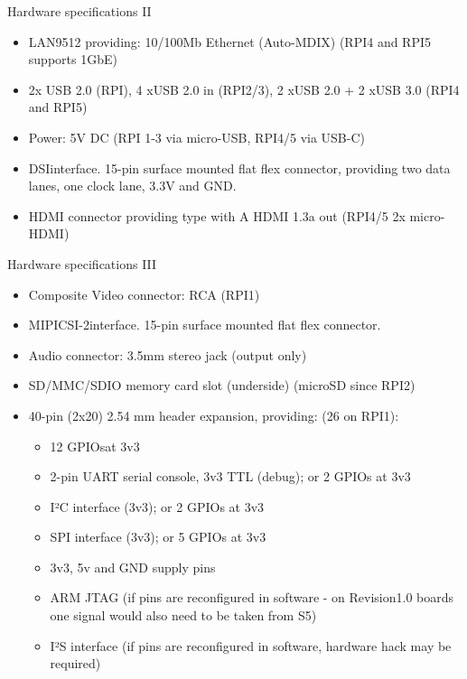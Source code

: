 \begin{frame}{Hardware specifications II}
    \begin{itemize}
        \item LAN9512 providing: 10/100Mb Ethernet (Auto-MDIX) (RPI4 and RPI5 supports 1GbE)
        \item 2x USB 2.0 (RPI), 4 xUSB 2.0 in (RPI2/3), 2 xUSB 2.0 + 2 xUSB 3.0 (RPI4 and RPI5)
        \item Power: 5V DC (RPI 1-3 via micro-USB, RPI4/5 via USB-C)
        \item DSIinterface. 15-pin surface mounted flat flex connector, providing two data lanes, one clock lane, 3.3V and GND.
        \item HDMI connector providing type with A HDMI 1.3a out (RPI4/5 2x micro-HDMI)
    \end{itemize}
\end{frame}

\begin{frame}{Hardware specifications III}
\begin{itemize}
    \item Composite Video connector: RCA (RPI1)
     \item MIPICSI-2interface. 15-pin surface mounted flat flex connector.
     \item Audio connector: 3.5mm stereo jack (output only)
     \item SD/MMC/SDIO memory card slot (underside) (microSD since RPI2)
     \item 40-pin (2x20) 2.54 mm header expansion, providing: (26 on RPI1):
         \begin{itemize}
             \item 12 GPIOsat 3v3
            \item 2-pin UART serial console, 3v3 TTL (debug); or 2 GPIOs at 3v3
            \item I²C interface (3v3); or 2 GPIOs at 3v3
            \item SPI interface (3v3); or 5 GPIOs at 3v3
            \item 3v3, 5v and GND supply pins
            \item ARM JTAG (if pins are reconfigured in software - on Revision1.0 boards one signal would also need to be taken from S5)
            \item I²S interface (if pins are reconfigured in software, hardware hack may be required)
         \end{itemize}
\end{itemize}
\end{frame}

